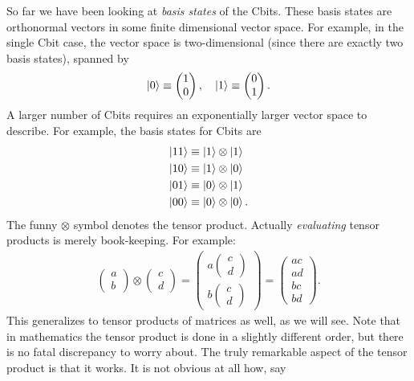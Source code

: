 \documentclass{book}
\theoremstyle{definition}
\newcommand{\nn}{\nonumber}
\begin{document}
So far we have been looking at \textit{basis states} of the Cbits. These basis states are orthonormal vectors in some finite dimensional vector space. For example, in the single Cbit case, the vector space is two-dimensional (since there are exactly two basis states), spanned by 
\begin{align}
\ket{0} \equiv \begin{pmatrix}
1 \\0
\end{pmatrix},\quad 
\ket{1} \equiv \begin{pmatrix}
0 \\ 1
\end{pmatrix}.
\end{align}
A larger number of Cbits requires an exponentially larger vector space to describe. For example, the basis states for Cbits are 
\begin{align}
\ket{11} &\equiv \ket{1} \otimes \ket{1}\nn\\
\ket{10} &\equiv \ket{1} \otimes \ket{0}\nn\\
\ket{01} &\equiv \ket{0} \otimes \ket{1}\nn\\
\ket{00} &\equiv \ket{0} \otimes \ket{0}\nn.
\end{align}
The funny $\otimes$ symbol denotes the tensor product. Actually \textit{evaluating} tensor products is merely book-keeping. For example:
\begin{align}
\begin{pmatrix}
a\\b
\end{pmatrix}\otimes
\begin{pmatrix}
c\\d
\end{pmatrix}
=
\begin{pmatrix}
a\begin{pmatrix}
c\\d
\end{pmatrix}
\\
b\begin{pmatrix}
c\\d
\end{pmatrix}
\end{pmatrix}
=
\begin{pmatrix}
ac\\ad\\bc\\bd
\end{pmatrix}.
\end{align} 
This generalizes to tensor products of matrices as well, as we will see. Note that in mathematics the tensor product is done in a slightly different order, but there is no fatal discrepancy to worry about. The truly remarkable aspect of the tensor product is that it works. It is not obvious at all how, say
\end{document}
